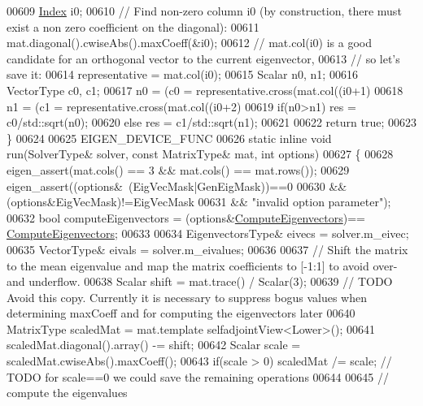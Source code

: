 \begin{DoxyCode}
00609     \hyperlink{group___eigenvalues___module_a8a59ab7734b6eae2754fd78bc7c3a360}{Index} i0;
00610     \textcolor{comment}{// Find non-zero column i0 (by construction, there must exist a non zero coefficient on the diagonal):}
00611     mat.diagonal().cwiseAbs().maxCoeff(&i0);
00612     \textcolor{comment}{// mat.col(i0) is a good candidate for an orthogonal vector to the current eigenvector,}
00613     \textcolor{comment}{// so let's save it:}
00614     representative = mat.col(i0);
00615     Scalar n0, n1;
00616     VectorType c0, c1;
00617     n0 = (c0 = representative.cross(mat.col((i0+1)%
00618     n1 = (c1 = representative.cross(mat.col((i0+2)%
00619     \textcolor{keywordflow}{if}(n0>n1) res = c0/std::sqrt(n0);
00620     \textcolor{keywordflow}{else}      res = c1/std::sqrt(n1);
00621 
00622     \textcolor{keywordflow}{return} \textcolor{keyword}{true};
00623   \}
00624 
00625   EIGEN\_DEVICE\_FUNC
00626   \textcolor{keyword}{static} \textcolor{keyword}{inline} \textcolor{keywordtype}{void} run(SolverType& solver, \textcolor{keyword}{const} MatrixType& mat, \textcolor{keywordtype}{int} options)
00627   \{
00628     eigen\_assert(mat.cols() == 3 && mat.cols() == mat.rows());
00629     eigen\_assert((options&~(EigVecMask|GenEigMask))==0
00630             && (options&EigVecMask)!=EigVecMask
00631             && \textcolor{stringliteral}{"invalid option parameter"});
00632     \textcolor{keywordtype}{bool} computeEigenvectors = (options&\hyperlink{group__enums_ggae3e239fb70022eb8747994cf5d68b4a9ada93d8885bde32b876ba4af01d3292cc}{ComputeEigenvectors})==
      \hyperlink{group__enums_ggae3e239fb70022eb8747994cf5d68b4a9ada93d8885bde32b876ba4af01d3292cc}{ComputeEigenvectors};
00633     
00634     EigenvectorsType& eivecs = solver.m\_eivec;
00635     VectorType& eivals = solver.m\_eivalues;
00636   
00637     \textcolor{comment}{// Shift the matrix to the mean eigenvalue and map the matrix coefficients to [-1:1] to avoid over- and
       underflow.}
00638     Scalar shift = mat.trace() / Scalar(3);
00639     \textcolor{comment}{// TODO Avoid this copy. Currently it is necessary to suppress bogus values when determining maxCoeff
       and for computing the eigenvectors later}
00640     MatrixType scaledMat = mat.template selfadjointView<Lower>();
00641     scaledMat.diagonal().array() -= shift;
00642     Scalar scale = scaledMat.cwiseAbs().maxCoeff();
00643     \textcolor{keywordflow}{if}(scale > 0) scaledMat /= scale;   \textcolor{comment}{// TODO for scale==0 we could save the remaining operations}
00644 
00645     \textcolor{comment}{// compute the eigenvalues}

\end{DoxyCode}

